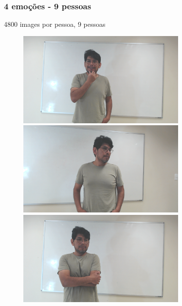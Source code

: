 \begin{frame}
\frametitle{4 emoções - \textbf{9 pessoas}}
4800 images por pessoa, 9 pessoas 
\begin{figure}[!ht]
    \centering
    \begin{minipage}[t]{0.45\textwidth}
    \centering
      \includegraphics[width=0.75\textwidth]{images/new/frame_count10_cam2.png}
    \end{minipage}
    \hfill
    \begin{minipage}[t]{0.45\textwidth}
    \centering
      \includegraphics[width=0.75\textwidth]{images/new/frame_count17_cam2.png}
    \end{minipage}
    \hfill
    \begin{minipage}[t]{0.45\textwidth}
    \centering
      \includegraphics[width=0.75\textwidth]{images/new/frame_count41_cam1.png}

\end{minipage}
\end{figure}
\end{frame}
